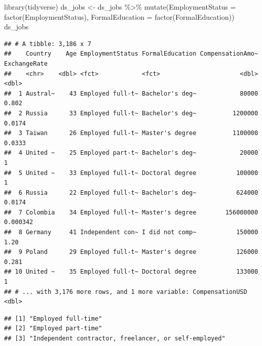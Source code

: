 \documentclass[
]{book}
\newenvironment{Shaded}{\begin{snugshade}}{\end{snugshade}}
\newcommand{\AttributeTok}[1]{\textcolor[rgb]{0.77,0.63,0.00}{#1}}
\newcommand{\FunctionTok}[1]{\textcolor[rgb]{0.00,0.00,0.00}{#1}}
\newcommand{\NormalTok}[1]{#1}
\newcommand{\OtherTok}[1]{\textcolor[rgb]{0.56,0.35,0.01}{#1}}
\newcommand{\SpecialCharTok}[1]{\textcolor[rgb]{0.00,0.00,0.00}{#1}}
\begin{document}
\begin{Shaded}
\begin{Highlighting}[]
\FunctionTok{library}\NormalTok{(tidyverse)}
\NormalTok{ds\_jobs }\OtherTok{\textless{}{-}}\NormalTok{ ds\_jobs }\SpecialCharTok{\%\textgreater{}\%}
  \FunctionTok{mutate}\NormalTok{(}\AttributeTok{EmploymentStatus =} \FunctionTok{factor}\NormalTok{(EmploymentStatus),}
         \AttributeTok{FormalEducation =} \FunctionTok{factor}\NormalTok{(FormalEducation))}
\NormalTok{ds\_jobs}
\end{Highlighting}
\end{Shaded}

\begin{verbatim}
## # A tibble: 3,186 x 7
##    Country    Age EmploymentStatus FormalEducation CompensationAmo~ ExchangeRate
##    <chr>    <dbl> <fct>            <fct>                      <dbl>        <dbl>
##  1 Austral~    43 Employed full-t~ Bachelor's deg~            80000     0.802   
##  2 Russia      33 Employed full-t~ Bachelor's deg~          1200000     0.0174  
##  3 Taiwan      26 Employed full-t~ Master's degree          1100000     0.0333  
##  4 United ~    25 Employed part-t~ Bachelor's deg~            20000     1       
##  5 United ~    33 Employed full-t~ Doctoral degree           100000     1       
##  6 Russia      22 Employed full-t~ Bachelor's deg~           624000     0.0174  
##  7 Colombia    34 Employed full-t~ Master's degree        156000000     0.000342
##  8 Germany     41 Independent con~ I did not comp~           150000     1.20    
##  9 Poland      29 Employed full-t~ Master's degree           126000     0.281   
## 10 United ~    35 Employed full-t~ Doctoral degree           133000     1       
## # ... with 3,176 more rows, and 1 more variable: CompensationUSD <dbl>
\end{verbatim}

\begin{Shaded}
\end{Shaded}

\begin{verbatim}
## [1] "Employed full-time"                                  
## [2] "Employed part-time"                                  
## [3] "Independent contractor, freelancer, or self-employed"
\end{verbatim}
\end{document}
